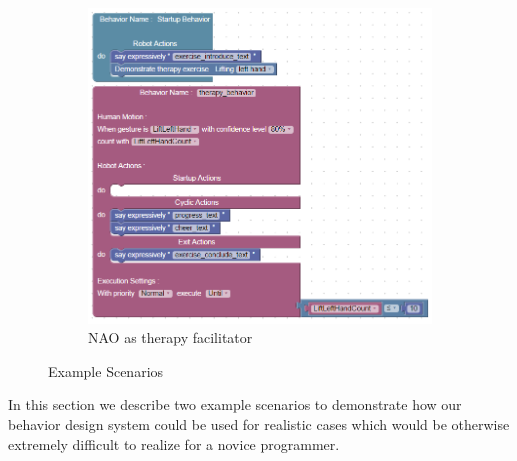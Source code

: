 \documentclass{llncs}
\begin{document}
\begin{figure}
\begin{subfigure}[t]{0.7\textwidth}
\includegraphics[width=\textwidth]{../thesis/assets/scenario2.png}
\caption[NAO as therapy facilitator]{NAO as therapy facilitator}
\label{fig:scenario2_program}
\end{subfigure}
\caption[Example Scenarios]{Example Scenarios}
\label{fig:scenarios}
\end{figure}
In this section we describe two example scenarios to demonstrate how our behavior design system could be used for realistic cases which would be otherwise extremely difficult to realize for a novice programmer.
\end{document}
